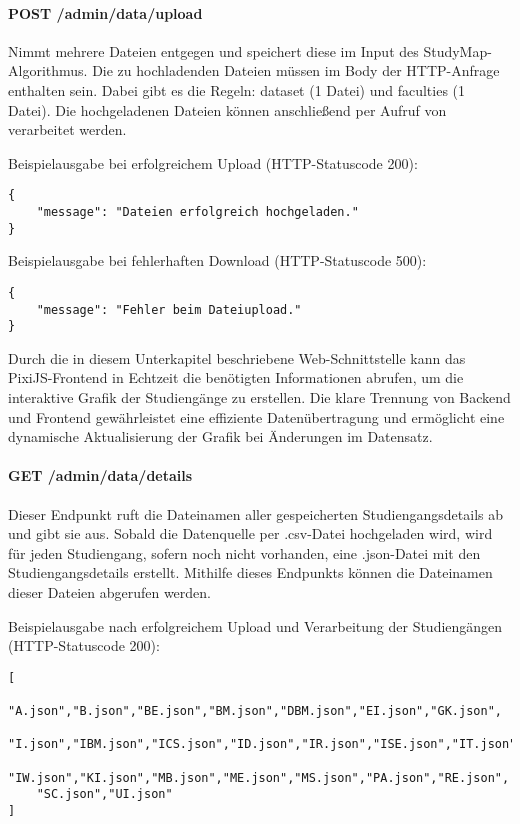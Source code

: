 \paragraph*{POST /admin/data/upload}
\vspace{-1.0em}
Nimmt mehrere Dateien entgegen und speichert diese im Input des StudyMap-Algorithmus. Die zu hochladenden Dateien müssen im Body der HTTP-Anfrage enthalten sein. Dabei gibt es die Regeln: dataset (1 Datei) und faculties (1 Datei). Die hochgeladenen Dateien können anschließend per Aufruf von  verarbeitet werden.

\noindent
Beispielausgabe bei erfolgreichem Upload (HTTP-Statuscode 200):
\begin{lstlisting}[style=Python]
{
    "message": "Dateien erfolgreich hochgeladen."
}
\end{lstlisting}

\noindent
Beispielausgabe bei fehlerhaften Download (HTTP-Statuscode 500):
\begin{lstlisting}[style=Python]
{
    "message": "Fehler beim Dateiupload."
}
\end{lstlisting}

Durch die in diesem Unterkapitel beschriebene Web-Schnittstelle kann das PixiJS-Frontend in Echtzeit die benötigten Informationen abrufen, um die interaktive Grafik der Studiengänge zu erstellen. Die klare Trennung von Backend und Frontend gewährleistet eine effiziente Datenübertragung und ermöglicht eine dynamische Aktualisierung der Grafik bei Änderungen im Datensatz.

\paragraph*{GET /admin/data/details}
\vspace{-1.0em}
Dieser Endpunkt ruft die Dateinamen aller gespeicherten Studiengangsdetails ab und gibt sie aus. Sobald die Datenquelle per .csv-Datei hochgeladen wird, wird für jeden Studiengang, sofern noch nicht vorhanden, eine .json-Datei mit den Studiengangsdetails erstellt. Mithilfe dieses Endpunkts können die Dateinamen dieser Dateien abgerufen werden.

\noindent
Beispielausgabe nach erfolgreichem Upload und Verarbeitung der Studiengängen (HTTP-Statuscode 200):
\begin{lstlisting}[style=Python]
[
    "A.json","B.json","BE.json","BM.json","DBM.json","EI.json","GK.json",
    "I.json","IBM.json","ICS.json","ID.json","IR.json","ISE.json","IT.json",
    "IW.json","KI.json","MB.json","ME.json","MS.json","PA.json","RE.json",
    "SC.json","UI.json"
]
\end{lstlisting}

